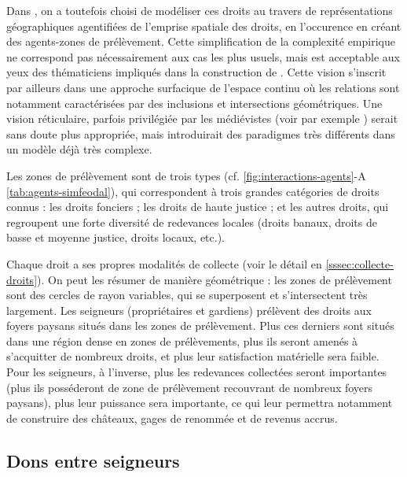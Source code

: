 \begin{tcolorbox}[breakable,left=0pt,right=0pt,top=0pt,bottom=0pt,
	colback=gray!15,colframe=gray!15,width=\dimexpr\textwidth\relax, 
	enlarge left by=0mm, boxsep=5pt,arc=0pt,outer arc=0pt,parbox=false]
Dans \simfeodal{}, on a toutefois choisi de modéliser ces droits au travers de représentations géographiques agentifiées de l'emprise spatiale des droits, en l'occurence en créant des agents-zones de prélèvement.
Cette simplification de la complexité empirique ne correspond pas nécessairement aux cas les plus usuels, mais est acceptable aux yeux des thématiciens impliqués dans la construction de \simfeodal{}.
Cette vision s'inscrit par ailleurs dans une approche surfacique de l'espace continu où les relations sont notamment caractérisées par des inclusions et intersections géométriques.
Une vision réticulaire, parfois privilégiée par les médiévistes (voir par exemple \cite{jegou_potentialites_2017}) serait sans doute plus appropriée, mais introduirait des paradigmes très différents dans un modèle déjà très complexe.

Les zones de prélèvement sont de trois types (cf. \cref{fig:interactions-agents}-A \cref{tab:agents-simfeodal}), qui correspondent à trois grandes catégories de droits connus : les droits fonciers ; les droits de haute justice ; et les autres droits, qui regroupent une forte diversité de redevances locales (droits banaux, droits de basse et moyenne justice, droits locaux, etc.).

Chaque droit a ses propres modalités de collecte (voir le détail en \cref{sssec:collecte-droits}).
On peut les résumer de manière géométrique : les zones de prélèvement sont des cercles de rayon variables, qui se superposent et s'intersectent très largement.
Les seigneurs (propriétaires et gardiens) prélèvent des droits aux foyers paysans situés dans les zones de prélèvement.
Plus ces derniers sont situés dans une région dense en zones de prélèvements, plus ils seront amenés à s'acquitter de nombreux droits, et plus leur satisfaction matérielle sera faible.
Pour les seigneurs, à l'inverse, plus les redevances collectées seront importantes (plus ils posséderont de zone de prélèvement recouvrant de nombreux foyers paysans), plus leur puissance sera importante, ce qui leur permettra notamment de construire des châteaux, gages de renommée et de revenus accrus.
\end{tcolorbox}

\subsection{Dons entre seigneurs \label{meca-dons}}

